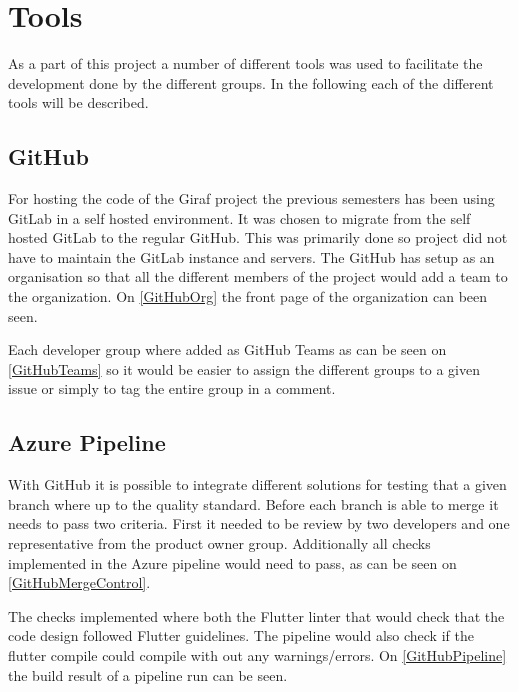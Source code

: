 \section{Tools}
As a part of this project a number of different tools was used to facilitate the development done by the different groups.
In the following each of the different tools will be described. 

\subsection{GitHub}
For hosting the code of the Giraf project the previous semesters has been using GitLab in a self hosted environment. 
It was chosen to migrate from the self hosted GitLab to the regular GitHub.
This was primarily done so project did not have to maintain the GitLab instance and servers.
The GitHub has setup as an organisation so that all the different members of the project would add a team to the organization. On \autoref{GitHubOrg} the front page of the organization can been seen. 


Each developer group where added as GitHub Teams as can be seen on \autoref{GitHubTeams} so it would be easier to assign the different groups to a given issue or simply to tag the entire group in a comment. 


\subsection{Azure Pipeline}
With GitHub it is possible to integrate different solutions for testing that a given branch where up to the quality standard. 
Before each branch is able to merge it needs to pass two criteria. 
First it needed to be review by two developers and one representative from the product owner group. 
Additionally all checks implemented in the Azure pipeline would need to pass, as can be seen on \autoref{GitHubMergeControl}. 


The checks implemented where both the Flutter linter that would check that the code design followed Flutter guidelines. 
The pipeline would also check if the flutter compile could compile with out any warnings/errors. 
On \autoref{GitHubPipeline} the build result of a pipeline run can be seen.

